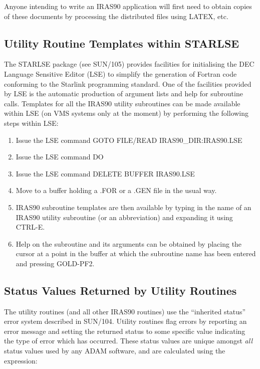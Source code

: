 Anyone intending to write an {\small IRAS90} application will first need to
obtain copies of these documents by processing the distributed files using
{\small LATEX}, etc. 

\subsection{Utility Routine Templates within STARLSE}
The {\small STARLSE} package (see SUN/105) provides facilities for initialising
the {\small DEC} Language Sensitive Editor ({\small LSE}) to simplify the
generation of Fortran code conforming to the Starlink programming standard. One
of the facilities provided by {\small LSE} is the automatic production of
argument lists and help for subroutine calls. Templates for all the {\small
IRAS90} utility subroutines can be made available within {\small LSE} (on
{\small VMS} systems only at the moment) by performing the following steps
within {\small LSE}: 

\begin{enumerate}
\item Issue the {\small LSE} command {\small GOTO FILE/READ IRAS90\_DIR:IRAS90.LSE}
\item Issue the {\small LSE} command {\small DO}
\item Issue the {\small LSE} command {\small DELETE BUFFER IRAS90.LSE}
\item Move to a buffer holding a {\small .FOR} or a {\small .GEN} file in the 
usual way.
\item {\small IRAS90} subroutine templates are then available by typing in the
name of an {\small IRAS90} utility subroutine (or an abbreviation) and expanding
it using {\small CTRL-E}. 
\item Help on the subroutine and its arguments can be obtained by placing the
cursor at a point in the buffer at which the subroutine name has been entered 
and pressing {\small GOLD-PF2}.
\end{enumerate}

\subsection{Status Values Returned by Utility Routines}
The utility routines (and all other {\small IRAS90} routines) use the 
``inherited status'' error system described in SUN/104. Utility routines flag 
errors by reporting an error message and setting the returned status to some 
specific value indicating the type of error which has occurred. These status 
values are unique amongst {\em all} status values used by any {\small ADAM} 
software, and are calculated using the expression:

